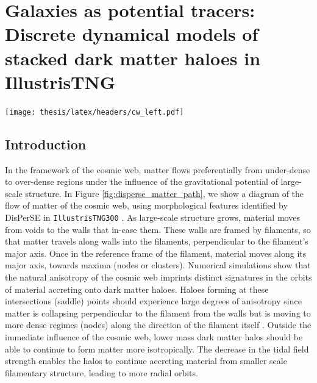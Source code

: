 \chapter[Discrete dynamical models of stacked dark matter haloes]{Galaxies as potential tracers: \\ Discrete dynamical models of stacked dark matter haloes in IllustrisTNG}
\label{ch:dyn_mod}
\vspace{-5.25in}
\texttt{[image: thesis/latex/headers/cw\_left.pdf]}
\vspace{3in}


\section{Introduction}
In the framework of the cosmic web, matter flows preferentially from under-dense to over-dense regions under the influence of the gravitational potential of large-scale structure. In Figure \ref{fig:disperse_matter_path}, we show a diagram of the flow of matter of the cosmic web, using morphological features identified by DisPerSE in \texttt{IllustrisTNG300} . As large-scale structure grows, material moves from voids to the walls that in-case them. These walls are framed by filaments, so that matter travels along walls into the filaments, perpendicular to the filament's major axis. Once in the reference frame of the filament, material moves along its major axis, towards maxima (nodes or clusters). Numerical simulations show that the natural anisotropy of the cosmic web imprints distinct signatures in the orbits of material accreting onto dark matter haloes. Haloes forming at these intersections (saddle) points should experience large degrees of anisotropy since matter is collapsing perpendicular to the filament from the walls but is moving to more dense regimes (nodes) along the direction of the filament itself \citep[e.g.][for galaxy properties in saddle environments]{kraljic2019saddle}. Outside the immediate influence of the cosmic web, lower mass dark matter halos should be able to continue to form matter more isotropically. The decrease in the tidal field strength enables the halos to continue accreting material from smaller scale filamentary structure, leading to more radial orbits.

